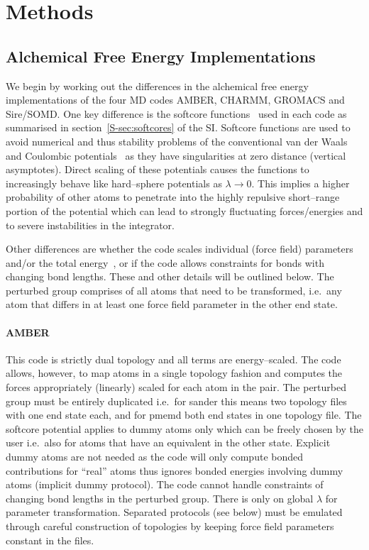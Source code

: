 \documentclass[journal=jctcce,manuscript=article]{achemso}
\begin{document}
\section{Methods}
\label{sec:methods}

\subsection{Alchemical Free Energy Implementations}
\label{sec:afe_impl}

We begin by working out the differences in the alchemical free energy
implementations of the four MD codes AMBER, CHARMM, GROMACS and
Sire/SOMD.  One key difference is the softcore
functions~\cite{beutler_avoiding_1994,
  zacharias_separationshifted_1994} used in each code as summarised in
section~\ref{S-sec:softcores} of the SI.  Softcore functions are used to avoid numerical and thus
stability problems of the conventional van der Waals and Coulombic
potentials~\cite{steinbrecher_nonlinear_2007} as they have
singularities at zero distance (vertical asymptotes).  Direct scaling
of these potentials causes the functions to increasingly behave like
hard--sphere potentials as $\lambda\rightarrow 0$.  This implies a
higher probability of other atoms to penetrate into the highly
repulsive short--range portion of the potential which can lead to
strongly fluctuating forces/energies and to severe instabilities in
the integrator.

Other differences are whether the code scales individual (force field)
parameters and/or the total energy~\cite{doi:10.1021/jp981628n}, or if
the code allows constraints for bonds with changing bond lengths.
These and other details will be outlined below.  The perturbed group
comprises of all atoms that need to be transformed, i.e.\ any atom
that differs in at least one force field parameter in the other end
state.

\paragraph{AMBER} This code is strictly dual topology and all terms
are energy--scaled.  The code allows, however, to map atoms in a
single topology fashion and computes the forces appropriately
(linearly) scaled for each atom in the pair.  The perturbed group must
be entirely duplicated i.e.\ for sander this means two topology files
with one end state each, and for pmemd both end states in one topology
file.  The softcore potential applies to dummy atoms only which
can be freely chosen by the user i.e.\ also for atoms that have an equivalent in the other state.  Explicit dummy atoms are not
needed as the code will only compute bonded contributions for ``real''
atoms thus ignores bonded energies involving dummy atoms (implicit dummy protocol).  The code cannot handle constraints of changing bond lengths in the perturbed group.  There is only on global $\lambda$ for parameter transformation.  Separated protocols (see below) must be emulated through careful construction of topologies by keeping force field parameters constant in the files.
\end{document}
